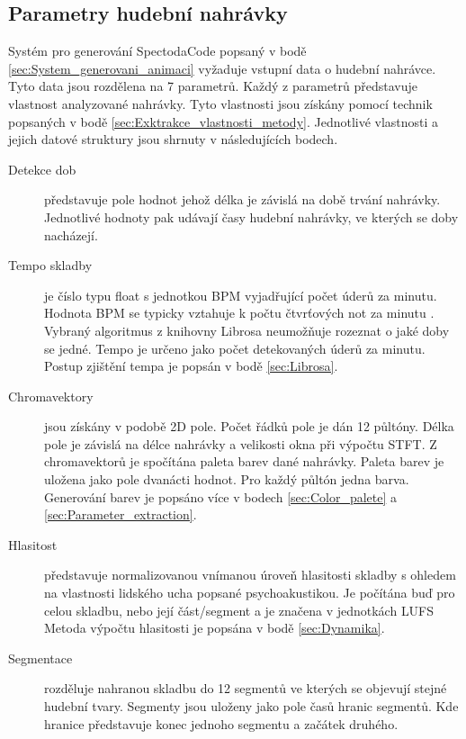 \subsection{Parametry hudební nahrávky} \label{sec:Parametry_nahravky}

Systém pro generování SpectodaCode popsaný v bodě \ref{sec:System_generovani_animaci} vyžaduje vstupní data o hudební nahrávce. Tyto data jsou rozdělena na 7 parametrů. Každý z parametrů představuje vlastnost analyzované nahrávky. Tyto vlastnosti jsou získány pomocí technik popsaných v bodě \ref{sec:Exktrakce_vlastnosti_metody}. Jednotlivé vlastnosti a jejich datové struktury jsou shrnuty v následujících bodech.

\begin{description}
    \item[Detekce dob] představuje pole hodnot jehož délka je závislá na době trvání nahrávky. Jednotlivé hodnoty pak udávají časy hudební nahrávky, ve kterých se doby nacházejí.
    
    \item[Tempo skladby] je číslo typu float s jednotkou \acs{BPM} vyjadřující počet úderů za minutu. Hodnota BPM se typicky vztahuje k počtu čtvrťových not za minutu \cite{Harvard_dictionary_of_music}. Vybraný algoritmus z knihovny Librosa neumožňuje rozeznat o jaké doby se jedné. Tempo je určeno jako počet detekovaných úderů za minutu. Postup zjištění tempa je popsán v bodě \ref{sec:Librosa}.

    \item[Chromavektory] jsou získány v podobě 2D pole. Počet řádků pole je dán 12 půltóny. Délka pole je závislá na délce nahrávky a velikosti okna při výpočtu \acs{STFT}. Z chromavektorů je spočítána paleta barev dané nahrávky. Paleta barev je uložena jako pole dvanácti hodnot. Pro každý půltón jedna barva. Generování barev je popsáno více v bodech \ref{sec:Color_palete} a \ref{sec:Parameter_extraction}.

    \item[Hlasitost] představuje normalizovanou vnímanou úroveň hlasitosti skladby s ohledem na vlastnosti lidského ucha popsané psychoakustikou. Je počítána buď pro celou skladbu, nebo její část/segment a je značena v jednotkách \acs{LUFS} Metoda výpočtu hlasitosti je popsána v bodě \ref{sec:Dynamika}.

    \item[Segmentace] rozděluje nahranou skladbu do 12 segmentů ve kterých se objevují stejné hudební tvary. Segmenty jsou uloženy jako pole časů hranic segmentů. Kde hranice představuje konec jednoho segmentu a začátek druhého.


\end{description}
